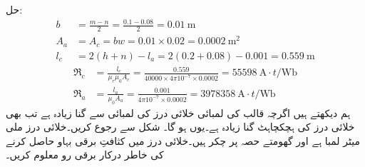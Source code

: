 حل:
\begin{align*}
b&=\frac{m-n}{2}=\frac{0.1-0.08}{2}=\SI{0.01}{\meter}\\
A_a&=A_c=bw=0.01 \times 0.02=\SI{0.0002}{\square \meter}\\
l_c&=2(h+n)-l_a=2(0.2+0.08)-0.001=\SI{0.559}{\meter}
\end{align*}
%
\begin{align*}
\Re_c&=\frac{l_c}{\mu_r \mu_0 A_c}=\frac{0.559}{40000 \times 4 \pi 10^{-7} \times 0.0002}=\SI{55598}{\ampere \cdot t \per \weber}\\
\Re_a&=\frac{l_a}{\mu_0 A_a}=\frac{0.001}{4 \pi 10^{-7} \times 0.0002}=\SI{3978358}{\ampere \cdot t \per \weber}
\end{align*}
ہم دیکھتے ہیں اگرچہ قالب کی لمبائی خلائی درز کی لمبائی سے  گنا زیادہ ہے تب بھی خلائی درز کی ہچکچاہٹ  گنا زیادہ ہے۔یوں   ہو گا۔
%
شکل   سے رجوع کریں۔خلائی درز  ملی میٹر لمبا ہے اور گھومتے حصہ پر  چکر ہیں۔خلائی درز میں  کثافتِ برقی بہاو حاصل کرنے کی خاطر درکار برقی رو معلوم کریں۔
